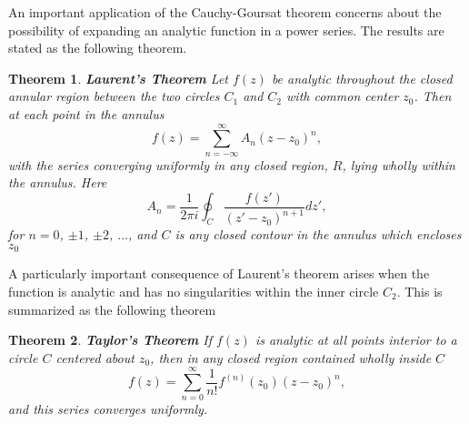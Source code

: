 \documentclass[11pt, letterpaper]{article}
\newtheorem{thm}{Theorem}
\begin{document}
An important application of the Cauchy-Goursat theorem concerns about the possibility of expanding an analytic function
in a power series. The results are stated as the following theorem.
\begin{thm}
{\bf Laurent's Theorem} Let $f(z)$ be analytic throughout the closed annular region between the two circles $C_1$ and $C_2$
with common center $z_0$. Then at each point in the annulus
\begin{equation}
	f(z) = \sum_{n=-\infty}^{\infty} A_n(z-z_0)^n,
\end{equation}
with the series converging uniformly in any closed region, $R$, lying wholly within the annulus. Here
\begin{equation}
	A_n = \frac{1}{2\pi i}\oint_C\frac{f(z')}{(z'-z_0)^{n+1}}dz',
\end{equation}
for $n=0$, $\pm 1$, $\pm 2$, $\ldots$, and $C$ is any closed contour in the annulus which encloses $z_0$
\end{thm}
A particularly important consequence of Laurent's theorem arises when the function is analytic and has no singularities within
the inner circle $C_2$. This is summarized as the following theorem
\begin{thm}
{\bf Taylor's Theorem} If $f(z)$ is analytic at all points interior to a circle $C$ centered about $z_0$, then in any closed
region contained wholly inside $C$
\begin{equation}
	f(z) = \sum_{n=0}^{\infty}\frac{1}{n!}f^{(n)}(z_0)(z-z_0)^n,
\end{equation}
and this series converges uniformly.
\end{thm}
\end{document}
